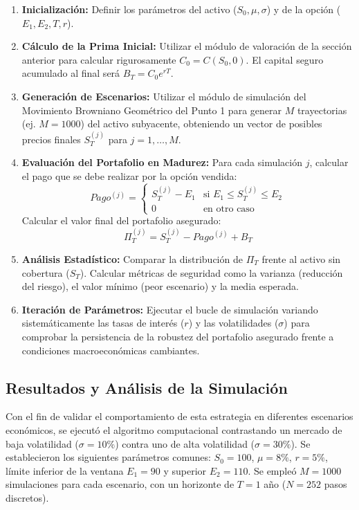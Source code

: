 \documentclass[12pt]{article}
\begin{document}
\begin{enumerate}
    \item \textbf{Inicialización:} Definir los parámetros del activo ($S_0, \mu, \sigma$) y de la opción ($E_1, E_2, T, r$).
    \item \textbf{Cálculo de la Prima Inicial:} Utilizar el módulo de valoración de la sección anterior para calcular rigurosamente $C_0 = C(S_0, 0)$. El capital seguro acumulado al final será $B_T = C_0 e^{rT}$.
    \item \textbf{Generación de Escenarios:} Utilizar el módulo de simulación del Movimiento Browniano Geométrico del Punto 1 para generar $M$ trayectorias (ej. $M=1000$) del activo subyacente, obteniendo un vector de posibles precios finales $S_T^{(j)}$ para $j = 1, \dots, M$.
    \item \textbf{Evaluación del Portafolio en Madurez:}
    Para cada simulación $j$, calcular el pago que se debe realizar por la opción vendida:
    \begin{equation}
    Pago^{(j)} = 
    \begin{cases} 
    S_T^{(j)} - E_1 & \text{si } E_1 \leq S_T^{(j)} \leq E_2 \\
    0 & \text{en otro caso}
    \end{cases}
    \end{equation}
    Calcular el valor final del portafolio asegurado: 
    \begin{equation}
    \Pi_T^{(j)} = S_T^{(j)} - Pago^{(j)} + B_T
    \end{equation}
    \item \textbf{Análisis Estadístico:} Comparar la distribución de $\Pi_T$ frente al activo sin cobertura ($S_T$). Calcular métricas de seguridad como la varianza (reducción del riesgo), el valor mínimo (peor escenario) y la media esperada.
    \item \textbf{Iteración de Parámetros:} Ejecutar el bucle de simulación variando sistemáticamente las tasas de interés ($r$) y las volatilidades ($\sigma$) para comprobar la persistencia de la robustez del portafolio asegurado frente a condiciones macroeconómicas cambiantes.
\end{enumerate}

\subsection{Resultados y Análisis de la Simulación}

Con el fin de validar el comportamiento de esta estrategia en diferentes escenarios económicos, se ejecutó el algoritmo computacional contrastando un mercado de baja volatilidad ($\sigma=10\%$) contra uno de alta volatilidad ($\sigma=30\%$). Se establecieron los siguientes parámetros comunes: $S_0 = 100$, $\mu=8\%$, $r=5\%$, límite inferior de la ventana $E_1 = 90$ y superior $E_2 = 110$. Se empleó $M=1000$ simulaciones para cada escenario, con un horizonte de $T=1$ año ($N=252$ pasos discretos).
\end{document}

